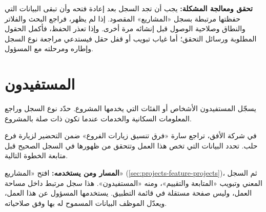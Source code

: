 \textbf{تحقق ومعالجة المشكلة:} يجب أن تجد السجل بعد إعادة فتحه وأن تبقى البيانات التي حفظتها مرتبطة بسجل «المشاريع» المقصود. إذا لم يظهر، فراجع البحث والفلاتر والنطاق وصلاحية الوصول قبل إنشائه مرة أخرى. وإذا تعذر الحفظ، فأكمل الحقول المطلوبة ورسائل التحقق؛ أما غياب تبويب أو قفل حقل فيستدعي مراجعة نوع السجل وإطاره ومرحلته مع المسؤول.

\clearpage
\section{المستفيدون}
\label{sec:projects-feature-beneficiaries}

يسجّل المستفيدون الأشخاص أو الفئات التي يخدمها المشروع. حدّد نوع السجل وراجع المعلومات السكانية والخدمات عندما تكون ذات صلة بالمشروع.

\begin{rcnote}
في شركة الأفق، تراجع سارة «فرق تنسيق زيارات الفروع» ضمن التحضير لزيارة فرع حلب. تحدد البيانات التي تخص هذا العمل وتتحقق من ظهورها في السجل الصحيح قبل متابعة الخطوة التالية.
\end{rcnote}

\textbf{المسار ومن يستخدمه:} افتح «المشاريع» (\ref{sec:projects-feature-projects})، ثم السجل المعني وتبويب «المتابعة والتقييم»، ومنه «المستفيدون». هذا سجل مرتبط داخل مساحة العمل، وليس صفحة مستقلة في قائمة التطبيق. يستخدمها المسؤول عن هذا العمل، ويعدّل الموظف البيانات المسموح له بها وفق صلاحياته.

